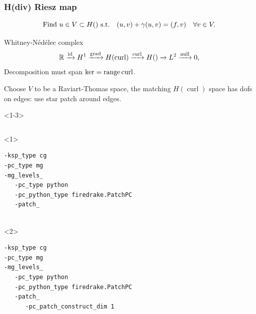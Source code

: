 \documentclass[presentation,aspectratio=43, 10pt]{beamer}
\DeclareMathOperator{\grad}{grad}
\let\div\relax
\DeclareMathOperator{\div}{div}
\DeclareMathOperator{\curl}{curl}
\DeclareMathOperator{\range}{range}
\begin{document}
\begin{frame}[fragile, t]
  \frametitle{H(div) Riesz map}
  \vspace{-1.5\baselineskip}
  \begin{equation*}
    \text{Find $u \in V \subset H(\div)$ s.t.}\quad (u, v) + \gamma (\div u, \div v) = (f, v) \quad \forall v \in V.
  \end{equation*}
  \vspace*{-\baselineskip}
  \begin{block}{Whitney-N\'ed\'elec complex}
    \begin{equation*}
      \mathbb{R} \xrightarrow{\operatorname{id}} H^1 \xrightarrow{\grad} H(\curl)
      \xrightarrow{\curl} H(\div) \xrightarrow{\div} L^2 \xrightarrow{\operatorname{null}} 0,
    \end{equation*}
    Decomposition must span $\ker \div = \range \curl$.

    Choose $V$ to be a Raviart-Thomas space, the matching $H(\curl)$
    space has dofs on edges: use star patch around edges.
  \end{block}
  \begin{onlyenv}<1-3>
    \begin{columns}
      \begin{column}{0.6\textwidth}
        \begin{onlyenv}<1>
\begin{verbatim}
-ksp_type cg
-pc_type mg
-mg_levels_
   -pc_type python
   -pc_python_type firedrake.PatchPC
   -patch_


\end{verbatim}
        \end{onlyenv}
        \begin{onlyenv}<2>
\begin{verbatim}
-ksp_type cg
-pc_type mg
-mg_levels_
   -pc_type python
   -pc_python_type firedrake.PatchPC
   -patch_
      -pc_patch_construct_dim 1


\end{verbatim}
\end{onlyenv}
\end{column}
\end{columns}
\end{onlyenv}
\end{frame}
\end{document}
